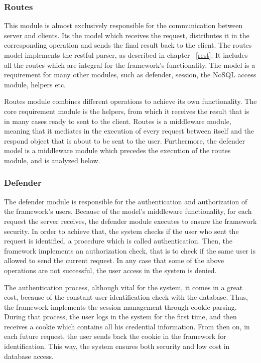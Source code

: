 \subsubsection{Routes}
This module is almost exclusively responsible for the communication between server and clients. Its the model which receives the request, distributes it in the corresponding operation and sends the final result back to the client. The routes model implements the restful parser, as described in chapter ~\ref{rest}. It includes all the routes which are integral for the framework's functionality. The model is a requirement for many other modules, such as defender, session, the NoSQL access module, helpers etc.\par
Routes module combines different operations to achieve its own functionality. The core requirement module is the helpers, from which it receives the result that is in many cases ready to sent to the client. Routes is a middleware module, meaning that it mediates in the execution of every request between itself and the respond object that is about to be sent to the user. Furthermore, the defender model is a middleware module which precedes the execution of the routes module, and is analyzed below.

\subsubsection{Defender}
\label{def}
The defender module is responsible for the authentication and authorization of the framework's users. Because of the model's middleware functionality, for each request the server receives, the defender module executes to ensure the framework security. In order to achieve that, the system checks if the user who sent the request is identified, a procedure which is called authentication. Then, the framework implements an authorization check, that is to check if the same user is allowed to send the current request. In any case that some of the above operations are not successful, the user access in the system is denied. \par
	The authentication process, although vital for the system, it comes in a great cost, because of the constant user identification check with the database. Thus, the framework implements the session management through cookie parsing. During that process, the user logs in the system for the first time, and then receives a cookie which contains all his credential information. From then on, in each future request, the user sends back the cookie in the framework for identification. This way, the system ensures both security and low cost in database access.



